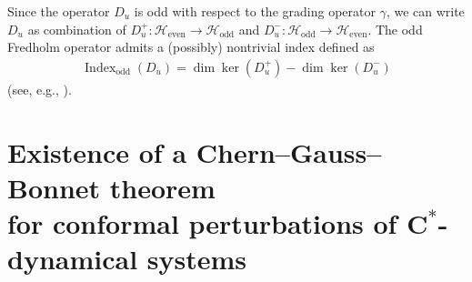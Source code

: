 \documentclass[pdftex]{sigma}
\newcommand{\Hh}{\mathscr{H}}
\DeclareMathOperator{\ind}{Index}
\numberwithin{equation}{section}
\begin{document}
Since the operator $D_u$ is odd with respect to the grading operator $\gamma$, we can write $D_u$ as combination of $D_u^+ \colon \Hh_\text{even} \to \Hh_\text{odd}$ and $D_u^- \colon \Hh_\text{odd} \to \Hh_\text{even}$. The odd Fredholm operator admits a (possibly) nontrivial index def\/ined as
\begin{gather}
\label{Eqn:DefOddIndex}
\ind_\text{odd}(D_u) = \dim \ker(D_u^+) - \dim \ker(D_u^-)
\end{gather}
(see, e.g., \cite[equation~(9.36), p.~397]{EltNCG}).

\section[Existence of a Chern--Gauss--Bonnet theorem for conformal perturbations of $C^*$-dynamical systems]{Existence of a Chern--Gauss--Bonnet theorem\\ for conformal perturbations of $\boldsymbol{C^*}$-dynamical systems}
\label{Sec:CGBTheorem}
\end{document}
